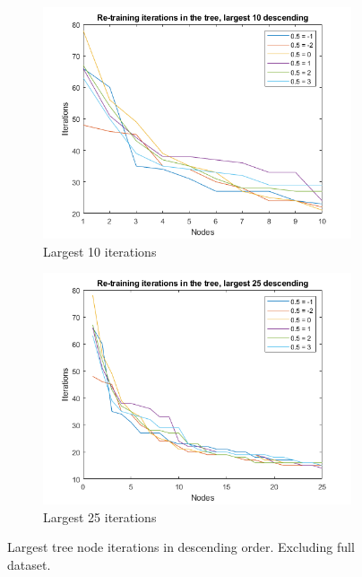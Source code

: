 \begin{figure}
    \centering
    \begin{subfigure}[b]{.45\textwidth}
        \centering
        \includegraphics[width=\textwidth]{figures/treeretrainiter10.png}
        \caption{Largest 10 iterations}
        \label{sfig:tree:treeiter10}
    \end{subfigure}
    \hfill
    \begin{subfigure}[b]{.45\textwidth}
        \centering
        \includegraphics[width=\textwidth]{figures/treeretrainiter25.png}
        \caption{Largest 25 iterations}
        \label{sfig:tree:treeiter25}
    \end{subfigure}
    \caption{Largest tree node iterations in descending order. Excluding full dataset.}
    \label{fig:tree:treeiter}
\end{figure}


